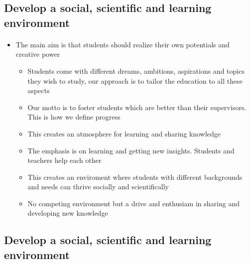 \documentclass[%
oneside,                 %
final,                   %
10pt]{article}
\begin{document}
\subsection{Develop a social, scientific and learning environment}

\paragraph{}
\begin{itemize}
\item The main aim is that students should realize their own potentials and creative power
\begin{itemize}

 \item Students come with different dreams, ambitions, aspirations and topics they wish to study, our approach is to tailor the education to all these aspects

 \item Our motto is to foster students which are better than their supervisors. This is how we define progress

 \item This creates an atmosphere for learning and sharing knowledge

 \item The emphasis is on learning and getting new insights. Students and teachers help each other

 \item This creates an enviroment where students with different backgrounds and needs can thrive socially and scientifically

 \item No competing environment but a drive and enthusiam in sharing and developing new knowledge
\end{itemize}

\noindent
\end{itemize}

\noindent





\subsection{Develop a social, scientific and learning environment}

\end{document}
